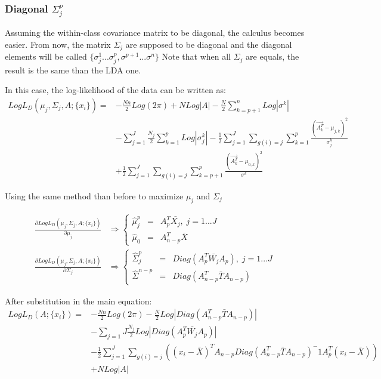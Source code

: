 \subsubsection{Diagonal $\Sigma_j^p$}
Assuming the within-class covariance matrix to be diagonal, the calculus becomes easier.
From now, the matrix $\Sigma_j$ are supposed to be diagonal and the diagonal elements will be called $\{\sigma_j^1...\sigma_j^p,
\sigma^{p + 1}...\sigma^n\}$
Note that when all $\Sigma_j$ are equals, the result is the same than the LDA one.

In this case, the log-likelihood of the data can be written as:
$$
\begin{array}{cl}
  Log L_D(\mu_j, \Sigma_j, A; \{x_i\}) = & -\frac{N n}{2} Log (2\pi) + N Log|A| - \frac{N}{2}\sum\limits_{k = p + 1}^n Log|\sigma^k| \\
  & - \sum\limits_{j = 1}^J \frac{N_j}{2} \sum\limits_{k = 1}^p Log|\sigma_j^k| - \frac{1}{2}\sum\limits_{j = 1}^J\sum\limits_{g(i) = j}
  \sum\limits_{k = 1}^p \frac{(\vec{A_k^T} - \mu_{j,k})^2}{\sigma_j^k} \\
  & + \frac{1}{2}\sum\limits_{j = 1}^J\sum\limits_{g(i) = j}
  \sum\limits_{k = p + 1}^p \frac{(\vec{A_k^T} - \mu_{0,k})^2}{\sigma^k}
\end{array}
$$

Using the same method than before to maximize $\mu_j$ and $\Sigma_j$

$$
\begin{array}{cc}
  \frac{\partial Log L_D(\mu_j, \Sigma_j, A; \{x_i\})}{\partial \mu_j} & \Rightarrow \left \{
  \begin{array}{ccc}
    \hat\mu_j^p & = & A_p^T\bar{X_j} ,\; j = 1...J\\
    \hat\mu_0 & = & A_{n - p}^T\bar{X}
  \end{array}
  \right . \\
  \frac{\partial Log L_D(\mu_j, \Sigma_j, A; \{x_i\})}{\partial \Sigma_j} & \Rightarrow \left \{
  \begin{array}{ccc}
    \hat\Sigma_j^p & = & Diag(A_p^T\bar{W_j}A_p), \; j = 1...J\\
    \hat\Sigma^{n - p} & = & Diag(A_{n - p}^T\bar{T}A_{n - p})
  \end{array}
  \right .
\end{array}
$$

After substitution in the main equation:
$$
\begin{array}{cl}
  Log L_D(A; \{x_i\}) = & - \frac{N n}{2} Log(2\pi) - \frac{N}{2} Log|Diag(A_{n - p}^T\bar{T}A_{n - p})| \\
  & - \sum\limits_{j = 1}{J}\frac{N_j}{2} Log|Diag(A_p^T\bar{W_j}A_p)| \\
  & - \frac{1}{2} \sum\limits_{j = 1}^J \sum\limits_{g(i) = j} ((x_i - \bar{X} )^T A_{n - p} Diag( A_{n - p}^T \bar{T} A_{n - p} )^-1 A_p^T(x_i - \bar{X}))\\
  & + N Log |A|
\end{array}
$$

